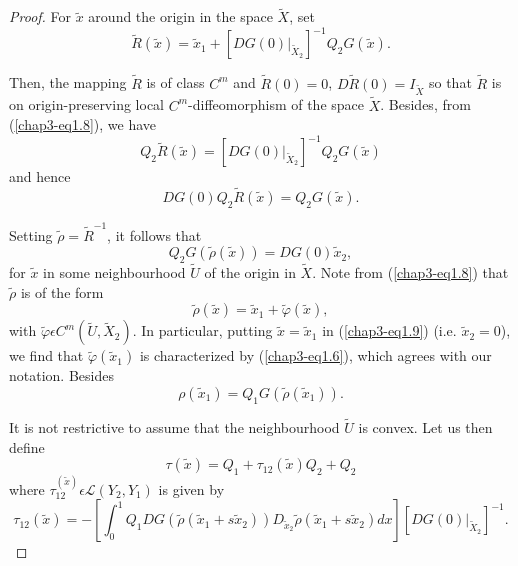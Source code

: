\begin{proof}
For $\widetilde{x}$ around the origin in the space $\widetilde{X}$,
set 
\begin{equation*}
\widetilde{R} (\widetilde{x}) = \widetilde{x}_{1} + \left[DG(0)
  |_{\widetilde{X}_{2}}\right]^{-1}
Q_{2}G(\widetilde{x}).\tag{1.8}\label{chap3-eq1.8} 
\end{equation*}

Then, the mapping $\widetilde{R}$ is of class $C^{m}$ and
$\widetilde{R}(0) = 0$, $D\widetilde{R}(0) = I_{\widetilde{X}}$ so
that $\widetilde{R}$ is on origin-preserving local
$C^{m}$-diffeomorphism of the space $\widetilde{X}$. Besides, from
(\ref{chap3-eq1.8}), we have
$$
Q_{2}\widetilde{R}(\widetilde{x}) = \left[DG(0)
  |_{\widetilde{X}_{2}}\right]^{-1} Q_{2}G(\widetilde{x})
$$
and hence
$$
DG(0) Q_{2}\widetilde{R}(\widetilde{x}) = Q_{2}G(\widetilde{x}).
$$

Setting $\widetilde{\rho} = \widetilde{R}^{-1}$, it follows that
\begin{equation*}
Q_{2}G(\widetilde{\rho}(\widetilde{x})) =
DG(0)\widetilde{x}_{2},\tag{1.9}\label{chap3-eq1.9} 
\end{equation*}
for $\widetilde{x}$ in some neighbourhood $\widetilde{U}$ of the
origin in $\widetilde{X}$. Note from (\ref{chap3-eq1.8}) that
$\widetilde{\rho}$ is of the form
\begin{equation*}
\widetilde{\rho}(\widetilde{x}) = \widetilde{x}_{1} + \widetilde{\varphi}(\widetilde{x}),\tag{1.10}\label{chap3-eq1.10}
\end{equation*}
with $\widetilde{\varphi} \epsilon C^{m} (\widetilde{U},
\widetilde{X}_{2})$. In particular, putting $\widetilde{x} =
\widetilde{x}_{1}$ in (\ref{chap3-eq1.9}) (i.e. $\widetilde{x}_{2} =
0$), we find that $\widetilde{\varphi}(\widetilde{x}_{1})$ is
characterized by (\ref{chap3-eq1.6}), which agrees with\pageoriginale
our notation. Besides
\begin{equation*}
\rho(\widetilde{x}_{1}) = Q_{1}G(\widetilde{\rho}(\widetilde{x}_{1})).\tag{1.11}\label{chap3-eq1.11}
\end{equation*}

It is not restrictive to assume that the neighbourhood $\widetilde{U}$
is convex. Let us then define
\begin{equation*}
\tau(\widetilde{x}) = Q_{1} + \tau_{12} (\widetilde{x}) Q_{2} +
Q_{2}\tag{1.12}\label{chap3-eq1.12} 
\end{equation*}
where $\tau_{12}^{(\widetilde{x})} \epsilon \mathscr{L} (Y_{2},
Y_{1})$ is given by
\begin{equation*}
\tau_{12} (\widetilde{x}) = -\left[\int_{0}^{1}
  Q_{1}DG(\widetilde{\rho}(\widetilde{x}_{1} + s\widetilde{x}_{2}))
  D_{\widetilde{x}_{2}} \widetilde{\rho}(\widetilde{x}_{1} +
  s\widetilde{x}_{2}) dx\right] \left[DG(0)
  |_{\widetilde{X}_{2}}\right]^{-1}.\tag{1.13}\label{chap3-eq1.13} 
\end{equation*}


\end{proof}
